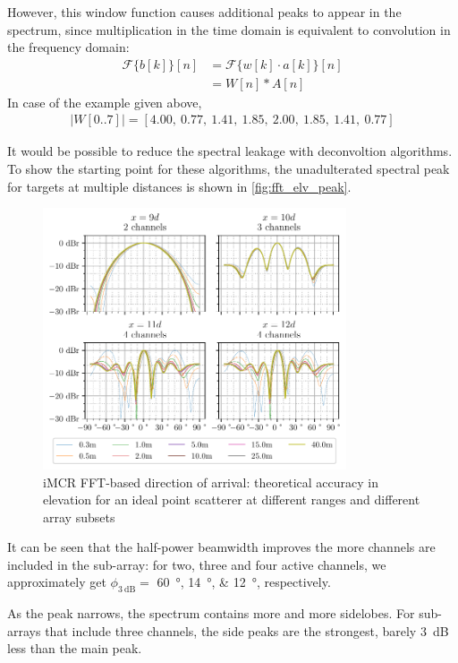 However, this window function causes additional peaks to appear in the spectrum,
since multiplication in the time domain is equivalent to convolution in the frequency domain:
\begin{align*}
    \mathcal{F}\{b[k]\}[n] & = \mathcal{F}\{w[k] \cdot  a[k]   \}[n] \\
                           & = W[n] * A[n]
\end{align*}
In case of the example given above,
\begin{align*}
    |W[0..7]| = [4.00,\ 0.77,\ 1.41,\ 1.85,\ 2.00,\ 1.85,\ 1.41,\ 0.77]
\end{align*}

It would be possible to reduce the spectral leakage with deconvoltion algorithms.
To show the starting point for these algorithms,
the unadulterated spectral peak for targets at multiple distances is shown in \autoref{fig:fft_elv_peak}.

\begin{figure}[h]
    \centering
    \includegraphics[width=0.8\textwidth]{../figures/fft_elv_peak.pdf}
    \caption{iMCR FFT-based direction of arrival: theoretical accuracy in elevation for an ideal point scatterer at different ranges and different array subsets}
    \label{fig:fft_elv_peak}
\end{figure}

It can be seen that the half-power beamwidth improves the more channels are included in the sub-array:
for two, three and four active channels, we approximately get
$\phi_{\SI{3}{\dB}}=$ \SIlist{60;14;12}{\degree}, respectively.

As the peak narrows, the spectrum contains more and more sidelobes.
For sub-arrays that include three channels, the side peaks are the strongest,
barely \SI{3}{\dB} less than the main peak. \\

